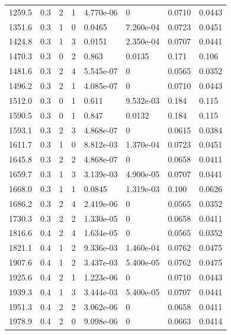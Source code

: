 \documentclass[preview]{standalone}
\begin{document}
{{{\begin{tabular}{L{1.2cm}C{1.2cm} C{0.3cm}C{0.5cm} C{1.4cm}C{1.4cm} C{1.4cm}C{1.4cm}}
  1259.5  &   0.3  & 2     &  1 &  4.770e-06  & 0  & 0.0710 &  0.0443   \\ 
  1351.6  &   0.3  & 1     &  0 &  0.0465  & 7.260e-04  & 0.0723 &  0.0451   \\ 
  1424.8  &   0.3  & 1     &  3 &  0.0151  & 2.350e-04  & 0.0707 &  0.0441   \\ 
  1470.3  &   0.3  & 0     &  2 &  0.863  & 0.0135  & 0.171 &  0.106   \\ 
  1481.6  &   0.3  & 2     &  4 &  5.545e-07  & 0  & 0.0565 &  0.0352   \\ 
  1496.2  &   0.3  & 2     &  1 &  4.085e-07  & 0  & 0.0710 &  0.0443   \\ 
  1512.0  &   0.3  & 0     &  1 &  0.611  & 9.532e-03  & 0.184 &  0.115   \\ 
  1590.5  &   0.3  & 0     &  1 &  0.847  & 0.0132  & 0.184 &  0.115   \\ 
  1593.1  &   0.3  & 2     &  3 &  4.868e-07  & 0  & 0.0615 &  0.0384   \\ 
  1611.7  &   0.3  & 1     &  0 &  8.812e-03  & 1.370e-04  & 0.0723 &  0.0451   \\ 
  1645.8  &   0.3  & 2     &  2 &  4.868e-07  & 0  & 0.0658 &  0.0411   \\ 
  1659.7  &   0.3  & 1     &  3 &  3.139e-03  & 4.900e-05  & 0.0707 &  0.0441   \\ 
  1668.0  &   0.3  & 1     &  1 &  0.0845  & 1.319e-03  & 0.100 &  0.0626   \\ 
  1686.2  &   0.3  & 2     &  4 &  2.419e-06  & 0  & 0.0565 &  0.0352   \\ 
  1730.3  &   0.3  & 2     &  2 &  1.330e-05  & 0  & 0.0658 &  0.0411   \\ 
  1816.6  &   0.4  & 2     &  4 &  1.634e-05  & 0  & 0.0565 &  0.0352   \\ 
  1821.1  &   0.4  & 1     &  2 &  9.336e-03  & 1.460e-04  & 0.0762 &  0.0475   \\ 
  1907.6  &   0.4  & 1     &  2 &  3.437e-03  & 5.400e-05  & 0.0762 &  0.0475   \\ 
  1925.6  &   0.4  & 2     &  1 &  1.223e-06  & 0  & 0.0710 &  0.0443   \\ 
  1939.3  &   0.4  & 1     &  3 &  3.444e-03  & 5.400e-05  & 0.0707 &  0.0441   \\ 
  1951.3  &   0.4  & 2     &  2 &  3.062e-06  & 0  & 0.0658 &  0.0411   \\ 
  1978.9  &   0.4  & 2     &  0 &  9.098e-06  & 0  & 0.0663 &  0.0414   \\ 

\end{tabular}}}}
\end{document}
